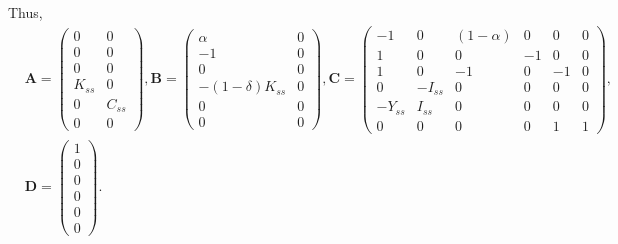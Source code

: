 \documentclass[11pt]{article}
\numberwithin{equation}{section} %
\numberwithin{figure}{section} %
\numberwithin{table}{section} %
\theoremstyle{definition}
\begin{document}
Thus,
\begin{align*}
    &\mathbf{A} = \begin{pmatrix}
        0 & 0 \\
        0 & 0 \\
        0 & 0 \\
        K_{ss} & 0 \\
        0 & C_{ss} \\
        0 & 0
    \end{pmatrix}, \mathbf{B} = \begin{pmatrix}
        \alpha & 0 \\
        -1 & 0 \\
        0 & 0 \\
        -(1-\delta) K_{ss} & 0 \\
        0 & 0 \\
        0 & 0
    \end{pmatrix}, \mathbf{C} = \begin{pmatrix}
        -1 & 0 & (1-\alpha) & 0 & 0 & 0 \\
        1 & 0 & 0 & -1 & 0 & 0 \\
        1 & 0 & -1 & 0 & -1 & 0 \\
        0 & -I_{ss} & 0 & 0 & 0 & 0 \\
        -Y_{ss} & I_{ss} & 0 & 0 & 0 & 0 \\
        0 & 0 & 0 & 0 & 1 & 1
    \end{pmatrix}, \\
    &\mathbf{D} = \begin{pmatrix}
        1 \\ 0 \\ 0 \\ 0 \\ 0 \\ 0
   \end{pmatrix}.
\end{align*}
\end{document}
